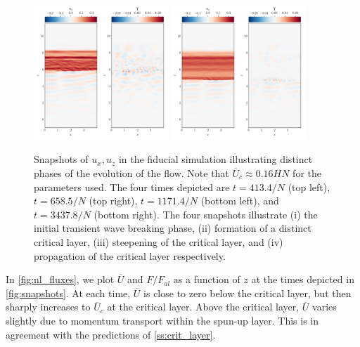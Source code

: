 \documentclass[
        fleqn,
        usenatbib,
        referee,
    ]{mnras}
\begin{document}
\begin{figure}
    \includegraphics[width=0.45\textwidth]{plots/yubo_000153.png}\hfil
    \includegraphics[width=0.45\textwidth]{plots/yubo_000451.png}
    \caption{Snapshots of $u_x, u_z$ in the fiducial simulation illustrating
    distinct phases of the evolution of the flow. Note that $\overline{U}_c
    \approx 0.16HN$ for the parameters used. The four times depicted are $t =
    413.4/N$ (top left), $t = 658.5/N$ (top right), $t = 1171.4/N$ (bottom
    left), and $t = 3437.8/N$ (bottom right). The four snapshots illustrate (i)
    the initial transient wave breaking phase, (ii) formation of a distinct
    critical layer, (iii) steepening of the critical layer, and (iv) propagation
    of the critical layer respectively.}\label{fig:snapshots}
\end{figure}

In \autoref{fig:nl_fluxes}, we plot $\overline{U}$ and $F / F_{al}$ as a function
of $z$ at the times depicted in \autoref{fig:snapshots}.
At each time, $\overline{U}$ is close to zero below the critical layer, but then
sharply increases to $\overline{U}_c$ at the critical layer. Above the critical
layer, $\overline{U}$ varies slightly due to momentum transport within the
spun-up layer. This is in agreement with the predictions
of \autoref{ss:crit_layer}.
\end{document}
